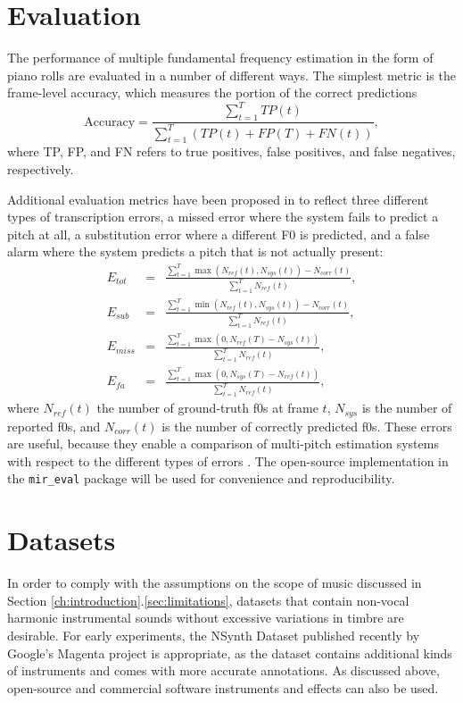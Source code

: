 \section{Evaluation}

The performance of multiple fundamental frequency estimation in the form of piano rolls are evaluated in a number of different ways.
The simplest metric is the frame-level accuracy, which measures the portion of the correct predictions 
\begin{equation}
\mathrm{Accuracy} = \frac{\sum_{t=1}^T TP(t)}{\sum_{t=1}^T \left ( TP(t) + FP(T) + FN(t) \right ) },
\end{equation}
where TP, FP, and FN refers to true positives, false positives, and false negatives, respectively.

Additional evaluation metrics have been proposed in \cite{poliner2007piano} to reflect three different types of transcription errors, a missed error where the system fails to predict a pitch at all, a substitution error where a different F0 is predicted, and a false alarm where the system predicts a pitch that is not actually present:
\begin{eqnarray}
E_{tot} & = & \frac{\sum_{t=1}^T \max ( N_{ref}(t), N_{sys}(t) ) - N_{corr}(t)}{\sum_{t=1}^T N_{ref}(t)}, \\
E_{sub} & = & \frac{\sum_{t=1}^T \min ( N_{ref}(t), N_{sys}(t) ) - N_{corr}(t)}{\sum_{t=1}^T N_{ref}(t)}, \\
E_{miss} & = & \frac{\sum_{t=1}^T \max ( 0, N_{ref}(T) - N_{sys}(t) )}{\sum_{t=1}^T N_{ref}(t)}, \\
E_{fa} & = &  \frac{\sum_{t=1}^T \max ( 0, N_{sys}(T) - N_{ref}(t) )}{\sum_{t=1}^T N_{ref}(t)},
\end{eqnarray}
where $N_{ref}(t)$ the number of ground-truth f0s at frame $t$, $N_{sys}$ is the number of reported f0s, and $N_{corr}(t)$ is the number of correctly predicted f0s.
These errors are useful, because they enable a comparison of multi-pitch estimation systems with respect to the different types of errors \cite{bay2009evaluation}.
The open-source implementation in the \texttt{mir\_eval} package \cite{raffel2014mir_eval} will be used for convenience and reproducibility.

\section{Datasets}

In order to comply with the assumptions on the scope of music discussed in Section \ref{ch:introduction}.\ref{sec:limitations}, datasets that contain non-vocal harmonic instrumental sounds without excessive variations in timbre are desirable.
For early experiments, the NSynth Dataset published recently by Google's Magenta project \cite{engel2017nsynth} is appropriate, as the dataset contains additional kinds of instruments and comes with more accurate annotations.
As discussed above, open-source and commercial software instruments and effects can also be used.

